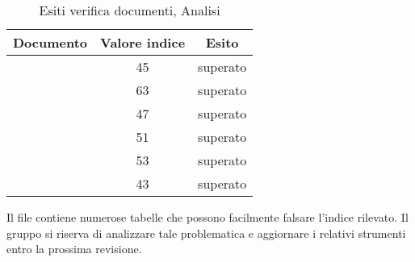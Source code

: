 	\begin{table}[h]
	\centering
	\begin{tabular}{ | c | c | c | }
    \hline
    Documento & Valore indice & Esito \\ \hline
    \AnalisiDeiRequisiti{} & 45 &  superato \\ \hline
    \Glossario{} & 63 &  superato \\ \hline
    \NormeDiProgetto{} & 47 &  superato \\ \hline
    \PianoDiProgetto{} & 51 &  superato \\ \hline
    \PianoDiQualifica{} & 53 &  superato \\ \hline
    \StudioDiFattibilita{} & 43 &  superato \\ \hline
    \end{tabular}
	\caption{Esiti verifica documenti, Analisi}
	\end{table}
	
	Il file \AnalisiDeiRequisiti{} contiene numerose tabelle che possono facilmente falsare l'indice rilevato. Il gruppo si riserva di analizzare tale problematica e aggiornare i relativi strumenti entro la prossima revisione.
	
	
	

	 	
	 	
	 
	 


	
